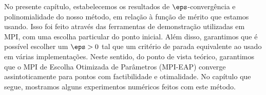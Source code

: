 No presente capítulo, estabelecemos os resultados de $\eps$-convergência e polinomialidade do nosso método, em relação à função de mérito que estamos usando. Isso foi feito através das ferramentas de demonstração utilizadas em \acl{MPI}, com uma escolha particular do ponto inicial. Além disso, garantimos que é possível escolher um $\eps>0$ tal que um critério de parada equivalente ao usado em várias implementações. Neste sentido, do ponto de vista teórico,  garantimos que o \ac{MPI} de Escolha Otimizada de Parâmetros (MPI-EAP) converge assintoticamente para pontos com factibilidade e otimalidade. No capítulo que segue, mostramos alguns experimentos numéricos feitos com este método.







